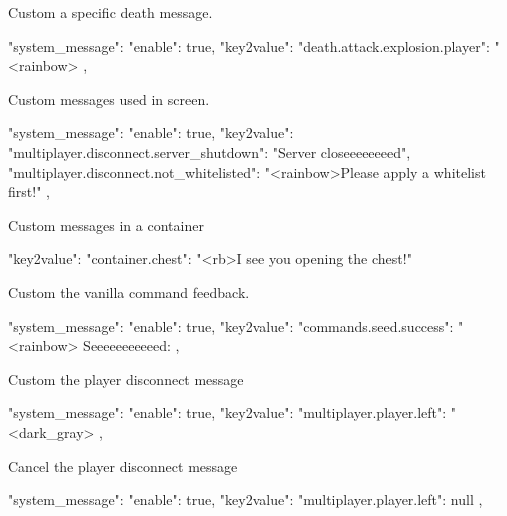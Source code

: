\begin{example}{Custom a specific death message.}
    \begin{json}
        "system_message": {
            "enable": true,
            "key2value": {
                "death.attack.explosion.player": "<rainbow>%
            }
        },
    \end{json}
\end{example}

\begin{example}{Custom messages used in screen.}
    \begin{json}
        "system_message": {
            "enable": true,
            "key2value": {
                "multiplayer.disconnect.server_shutdown": "Server closeeeeeeeed",
                "multiplayer.disconnect.not_whitelisted": "<rainbow>Please apply a whitelist first!"
            }
        },
    \end{json}
\end{example}

\begin{example}{Custom messages in a container}
    \begin{json}
        "key2value": {
            "container.chest": "<rb>I see you opening the chest!"
        }
    \end{json}
\end{example}

\begin{example}{Custom the vanilla command feedback.}
    \begin{json}
        "system_message": {
            "enable": true,
            "key2value": {
                "commands.seed.success": "<rainbow> Seeeeeeeeeeed: %
            }
        },
    \end{json}
\end{example}

\begin{example}{Custom the player disconnect message}
    \begin{json}
        "system_message": {
            "enable": true,
            "key2value": {
                "multiplayer.player.left": "<dark_gray>%
            }
        },
    \end{json}
\end{example}

\begin{example}{Cancel the player disconnect message}
    \begin{json}
        "system_message": {
            "enable": true,
            "key2value": {
                "multiplayer.player.left": null
            }
        },
    \end{json}
\end{example}
